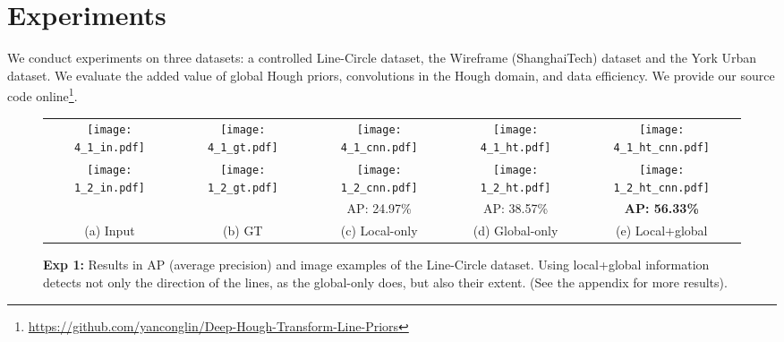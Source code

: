 \documentclass[runningheads]{llncs}
\begin{document}
 \section{Experiments}
We conduct experiments on three datasets: a controlled Line-Circle dataset, the Wireframe (ShanghaiTech) \cite{huang2018learning} dataset and the York Urban \cite{denis2008efficient} dataset. We evaluate the added value of global Hough priors, convolutions in the Hough domain, and data efficiency.
We provide our source code online\footnote{\url{https://github.com/yanconglin/Deep-Hough-Transform-Line-Priors}}.

\begin{figure}[t!]
    \centering
        \begin{tabular}{ccccc}        
            \texttt{[image: 4\_1\_in.pdf]} &
            \texttt{[image: 4\_1\_gt.pdf]} &
            \texttt{[image: 4\_1\_cnn.pdf]} &
            \texttt{[image: 4\_1\_ht.pdf]} &
            \texttt{[image: 4\_1\_ht\_cnn.pdf]}\\
            \texttt{[image: 1\_2\_in.pdf]} &
            \texttt{[image: 1\_2\_gt.pdf]} &
            \texttt{[image: 1\_2\_cnn.pdf]} &
            \texttt{[image: 1\_2\_ht.pdf]} &
            \texttt{[image: 1\_2\_ht\_cnn.pdf]} \\ \cmidrule(r){3-5}
             &  & AP: 24.97\% & AP: 38.57\% & \textbf{AP: 56.33\%} \\ \cmidrule(r){3-5}
             \scriptsize{(a) Input} & \scriptsize{(b) GT} & \scriptsize{(c) Local-only} & \scriptsize{(d) Global-only} & \scriptsize{(e) Local+global} \\             
        \end{tabular} 
       \caption{\textbf{Exp 1:} 
    Results in AP (average precision) and image examples of the Line-Circle dataset. 
    Using local+global information detects not only the direction of the lines, as the global-only does, but also their extent.
    (See the appendix for more results).}
    \label{fig:exp1}
\end{figure}
\end{document}
